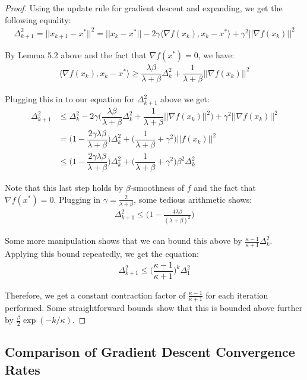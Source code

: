 \documentclass[12pt]{report}
\begin{document}
\begin{proof}
Using the update rule for gradient descent and expanding, we get the following equality:
\begin{align*}
\Delta_{k+1}^2 = ||x_{k+1}-x^*||^2 = ||x_k - x^*|| -2\gamma\langle \nabla f(x_k), x_k-x^*\rangle + \gamma^2||\nabla f(x_k)||^2\end{align*}

By Lemma 5.2 above and the fact that $\nabla f(x^*) = 0$, we have:
\begin{align*}
\langle \nabla f(x_k), x_k-x^*\rangle \geq \dfrac{\lambda\beta}{\lambda+\beta}\Delta_k^2 + \dfrac{1}{\lambda+\beta}||\nabla f(x_k)||^2\end{align*}

Plugging this in to our equation for $\Delta_{k+1}^2$ above we get:
\begin{align*}
\Delta_{k+1}^2 &\leq \Delta_k^2 -2\gamma\bigg(\dfrac{\lambda\beta}{\lambda+\beta}\Delta_k^2 + \dfrac{1}{\lambda+\beta}||\nabla f(x_k)||^2\bigg) + \gamma^2||\nabla f(x_k)||^2\\
&= \bigg(1-\dfrac{2\gamma\lambda\beta}{\lambda+\beta}\bigg)\Delta_k^2 + \bigg(\dfrac{1}{\lambda+\beta} + \gamma^2\bigg)||f(x_k)||^2\\
&\leq \bigg(1-\dfrac{2\gamma\lambda\beta}{\lambda+\beta}\bigg)\Delta_k^2 + \bigg(\dfrac{1}{\lambda+\beta} + \gamma^2\bigg)\beta^2\Delta_k^2
\end{align*}

Note that this last step holds by $\beta$-smoothness of $f$ and the fact that $\nabla f(x^*) = 0$. Plugging in $\gamma = \frac{2}{\lambda+\beta}$, some tedious arithmetic shows:
\begin{align*}
\Delta_{k+1}^2 \leq \bigg(1 - \frac{4\lambda\beta}{(\lambda+\beta)^2}\bigg)\end{align*}

Some more manipulation shows that we can bound this above by $\frac{\kappa-1}{\kappa+1}\Delta_k^2$. Applying this bound repeatedly, we get the equation:
\begin{align*}
\Delta_{k+1}^2 \leq \bigg(\dfrac{\kappa-1}{\kappa+1}\bigg)^k\Delta_1^2\end{align*}

Therefore, we get a constant contraction factor of $\frac{\kappa-1}{\kappa+1}$ for each iteration performed. Some straightforward bounds show that this is bounded above further by $\frac{\beta}{2}\exp(-k/\kappa)$.
\end{proof}

\subsection{Comparison of Gradient Descent Convergence Rates}
\end{document}
